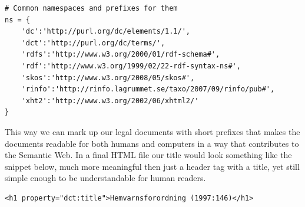 \begin{verbatim}
# Common namespaces and prefixes for them
ns = {
    'dc':'http://purl.org/dc/elements/1.1/',
    'dct':'http://purl.org/dc/terms/',
    'rdfs':'http://www.w3.org/2000/01/rdf-schema#',
    'rdf':'http://www.w3.org/1999/02/22-rdf-syntax-ns#',
    'skos':'http://www.w3.org/2008/05/skos#',
    'rinfo':'http://rinfo.lagrummet.se/taxo/2007/09/rinfo/pub#',
    'xht2':'http://www.w3.org/2002/06/xhtml2/'
}
\end{verbatim} 
\linebreak
\newline
This way we can mark up our legal documents with short prefixes that makes the documents readable for both humans and computers in a way that contributes to the Semantic Web. In a final HTML file our title would look something like the snippet below, much more meaningful then just a header tag with a title, yet still simple enough to be understandable for human readers.\\
\begin{verbatim}
<h1 property="dct:title">Hemvarnsforordning (1997:146)</h1>
\end{verbatim}
\linebreak
\newline

